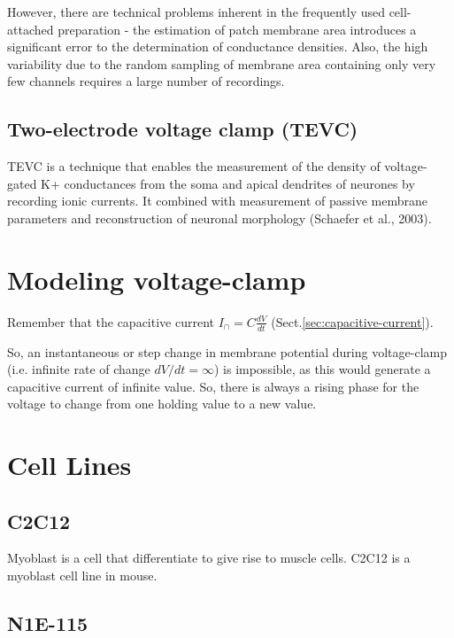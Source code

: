 However, there are technical problems inherent in the frequently used
cell-attached preparation - the estimation of patch membrane area introduces a
significant error to the determination of conductance densities. Also, the high
variability due to the random sampling of membrane area containing only very few
channels requires a large number of recordings.


\subsection{Two-electrode voltage clamp (TEVC)}
\label{sec:TEVC}

TEVC is a technique that enables the measurement of the density of voltage-gated
K+ conductances from the soma and apical dendrites of neurones by recording
ionic currents.
It combined with measurement of passive membrane parameters and reconstruction
of neuronal morphology (Schaefer et al., 2003).





\section{Modeling voltage-clamp}
\label{sec:voltage-clamp-modeling}
\label{sec:modeling-voltage-clamp}

Remember that the capacitive current $I_\cap=C\frac{dV}{dt}$
(Sect.\ref{sec:capacitive-current}).

So, an instantaneous or step change in membrane potential during voltage-clamp
(i.e. infinite rate of change $dV/dt=\infty$) is impossible, as this would
generate a capacitive current of infinite value.  So, there is always a rising
phase for the voltage to change from one holding value to a new value.



\section{Cell Lines}

\subsection{C2C12}

Myoblast is a cell that differentiate to give rise to muscle cells. C2C12 is a
myoblast cell line in mouse.

\subsection{N1E-115}

